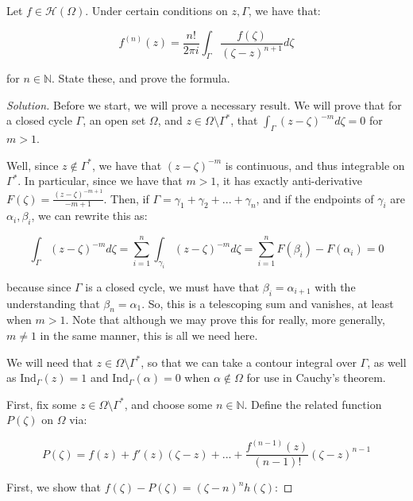 \documentclass[10pt]{article}
\newenvironment{problem}[2][]{\begin{trivlist}
\item[\hskip \labelsep {\bfseries #1}\hskip \labelsep {\bfseries #2.}]}{\end{trivlist}}
\begin{document}
\begin{problem}{Question 7}

Let $f \in \mathcal{H}(\Omega)$. Under certain conditions on $z, \Gamma$, we have that:

$$ f^{(n)}(z) = \frac{n!}{2\pi i} \int_\Gamma \frac{f(\zeta)}{(\zeta - z)^{n+1}} d\zeta$$

for $n \in \mathbb{N}$. State these, and prove the formula.

\end{problem}

\begin{proof}[Solution]

Before we start, we will prove a necessary result. We will prove that for a closed cycle $\Gamma$, an open set $\Omega$, and $z \in \Omega \setminus \Gamma^*$, that $\int_{\Gamma} (z - \zeta)^{-m} d\zeta = 0$ for $m  > 1$. 

Well, since $z \not \in \Gamma^*$, we have that $(z - \zeta)^{-m}$ is continuous, and thus integrable on $\Gamma^*$. In particular, since we have that $m > 1$, it has exactly anti-derivative $F(\zeta) = \frac{(z-\zeta)^{-m+1}}{-m+1}$. Then, if $\Gamma = \gamma_1 + \gamma_2 + ... + \gamma_n$, and if the endpoints of $\gamma_i$ are $\alpha_i, \beta_i$, we can rewrite this as:

$$ \int_{\Gamma} (z - \zeta)^{-m} d\zeta = \sum_{i=1}^n \int_{\gamma_i} (z - \zeta)^{-m} d\zeta = \sum_{i=1}^n F(\beta_i) - F(\alpha_i) = 0 $$

because since $\Gamma$ is a closed cycle, we must have that $\beta_i = \alpha_{i+1}$ with the understanding that $\beta_n = \alpha_1$. So, this is a telescoping sum and vanishes, at least when $m > 1$. Note that although we may prove this for really, more generally, $m \not = 1$ in the same manner, this is all we need here.

We will need that $z \in \Omega \setminus \Gamma^*$, so that we can take a contour integral over $\Gamma$, as well as $\text{Ind}_\Gamma(z) = 1$ and $\text{Ind}_\Gamma(\alpha) = 0$ when $\alpha \not \in \Omega$ for use in Cauchy's theorem.

First, fix some $z \in \Omega \setminus \Gamma^*$, and choose some $n \in \mathbb{N}$. Define the related function $P(\zeta)$ on $\Omega$ via:

$$ P(\zeta) = f(z) + f'(z)(\zeta - z) + ... + \frac{f^{(n-1)}(z)}{(n-1)!} (\zeta - z)^{n-1} $$

First, we show that $f(\zeta) - P(\zeta) = (\zeta - n)^n h(\zeta)$:


\end{proof}
\end{document}
